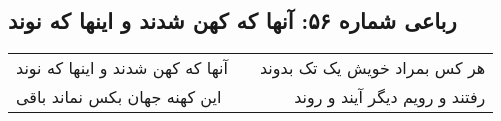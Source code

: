 \begin{center}
\section*{رباعی شماره ۵۶: آنها که کهن شدند و اینها که نوند}
\label{sec:sh056}
\begin{longtable}{l p{0.5cm} r}
آنها که کهن شدند و اینها که نوند
&&
هر کس بمراد خویش یک تک بدوند
\\
این کهنه جهان بکس نماند باقی
&&
رفتند و رویم دیگر آیند و روند
\\
\end{longtable}
\end{center}
